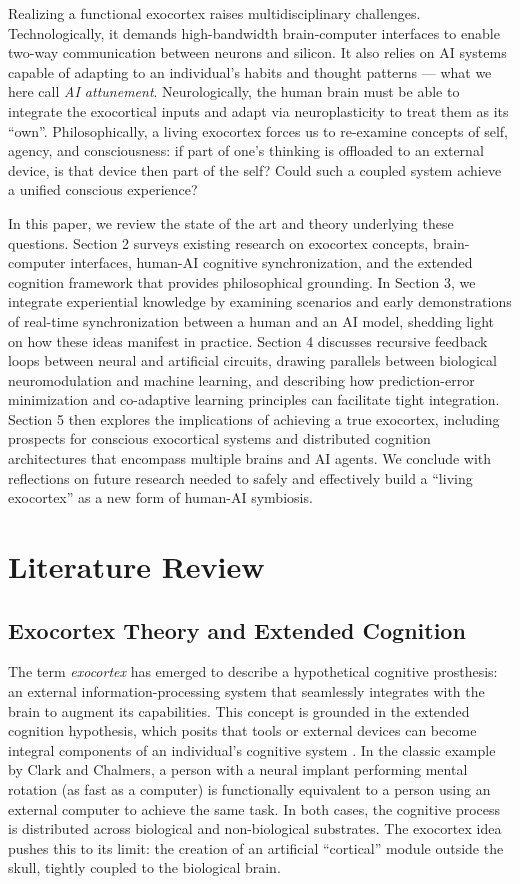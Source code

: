 \documentclass[11pt]{article}
\newcommand{\quotes}[1]{``#1''}
\begin{document}
Realizing a functional exocortex raises multidisciplinary challenges. Technologically, it demands high-bandwidth brain-computer interfaces to enable two-way communication between neurons and silicon. It also relies on AI systems capable of adapting to an individual's habits and thought patterns — what we here call \textit{AI attunement}. Neurologically, the human brain must be able to integrate the exocortical inputs and adapt via neuroplasticity to treat them as its \quotes{own}. Philosophically, a living exocortex forces us to re-examine concepts of self, agency, and consciousness: if part of one's thinking is offloaded to an external device, is that device then part of the self? Could such a coupled system achieve a unified conscious experience?

In this paper, we review the state of the art and theory underlying these questions. Section 2 surveys existing research on exocortex concepts, brain-computer interfaces, human-AI cognitive synchronization, and the extended cognition framework that provides philosophical grounding. In Section 3, we integrate experiential knowledge by examining scenarios and early demonstrations of real-time synchronization between a human and an AI model, shedding light on how these ideas manifest in practice. Section 4 discusses recursive feedback loops between neural and artificial circuits, drawing parallels between biological neuromodulation and machine learning, and describing how prediction-error minimization and co-adaptive learning principles can facilitate tight integration. Section 5 then explores the implications of achieving a true exocortex, including prospects for conscious exocortical systems and distributed cognition architectures that encompass multiple brains and AI agents. We conclude with reflections on future research needed to safely and effectively build a \quotes{living exocortex} as a new form of human-AI symbiosis.

\section{Literature Review}
\subsection{Exocortex Theory and Extended Cognition}
The term \textit{exocortex} has emerged to describe a hypothetical cognitive prosthesis: an external information-processing system that seamlessly integrates with the brain to augment its capabilities. This concept is grounded in the extended cognition hypothesis, which posits that tools or external devices can become integral components of an individual's cognitive system \cite{Clark1998}. In the classic example by Clark and Chalmers, a person with a neural implant performing mental rotation (as fast as a computer) is functionally equivalent to a person using an external computer to achieve the same task. In both cases, the cognitive process is distributed across biological and non-biological substrates. The exocortex idea pushes this to its limit: the creation of an artificial \quotes{cortical} module outside the skull, tightly coupled to the biological brain.
\end{document}
